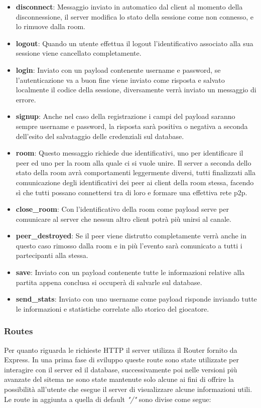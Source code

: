 \begin{itemize}
    \item \textbf{disconnect}: Messaggio inviato in automatico dal client al momento della disconnessione, il server modifica lo stato della sessione come non connesso, e lo rimuove dalla room.
    \item \textbf{logout}: Quando un utente effettua il logout l'identificativo associato alla sua sessione viene cancellato completamente.
    \item \textbf{login}: Inviato con un payload contenente username e password, se l'autenticazione va a buon fine viene inviato come risposta e salvato localmente il codice della sessione, diversamente verrà inviato un messaggio di errore.
    \item \textbf{signup}: Anche nel caso della registrazione i campi del payload saranno sempre username e password, la risposta sarà positiva o negativa a seconda dell'esito del salvataggio delle credenziali sul database.
    \item \textbf{room}: Questo messaggio richiede due identificativi, uno per identificare il peer ed uno per la room alla quale ci si vuole unire. Il server a seconda dello stato della room avrà comportamenti leggermente diversi, tutti finalizzati alla comunicazione degli identificativi dei peer ai client della room stessa, facendo sì che tutti possano connettersi tra di loro e formare una effettiva rete p2p.
    \item \textbf{close\_room}: Con l'identificativo della room come payload serve per comunicare al server che nessun altro client potrà più unirsi al canale.
    \item \textbf{peer\_destroyed}: Se il peer viene distrutto completamente verrà anche in questo caso rimosso dalla room e in più l'evento sarà comunicato a tutti i partecipanti alla stessa.
    \item \textbf{save}: Inviato con un payload contenente tutte le informazioni relative alla partita appena conclusa si occuperà di salvarle sul database.
    \item \textbf{send\_stats}: Inviato con uno username come payload risponde inviando tutte le informazioni e statistiche correlate allo storico del giocatore.
    
\end{itemize}


\subsubsection*{Routes}
Per quanto riguarda le richieste HTTP il server utilizza il Router fornito da Express. In una prima fase di sviluppo queste route sono state utilizzate per interagire con il server ed il database, successivamente poi nelle versioni più avanzate del sitema ne sono state mantenute solo alcune ai fini di offrire la possibilità all'utente che esegue il server di visualizzare alcune informazioni utili. Le route in aggiunta a quella di default \emph{"/"} sono divise come segue:

